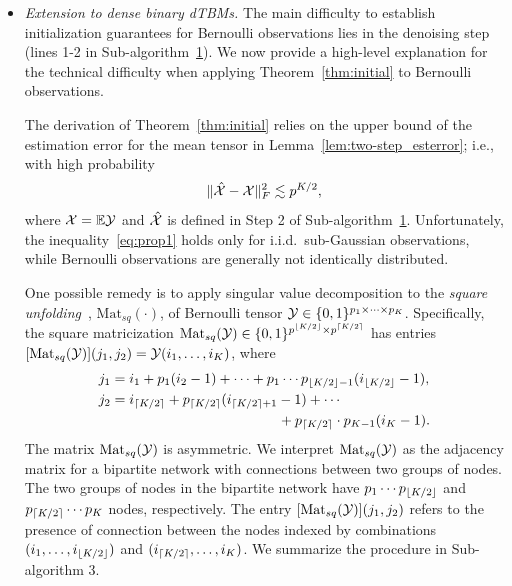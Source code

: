 \documentclass[journal]{IEEEtran}
\theoremstyle{definition}
\theoremstyle{definition}
\newcommand{\Mat}{\text{Mat}}
\DeclarePairedDelimiter{\ceil}{\lceil}{\rceil}
\DeclarePairedDelimiter{\floor}{\lfloor}{\rfloor}
\begin{document}
\begin{itemize}[wide]
    \item \textit{Extension to dense binary dTBMs.} The main difficulty to establish initialization guarantees for Bernoulli observations lies in the denoising step (lines 1-2 in Sub-algorithm~\hyperref[alg:main]{1}). We now provide a high-level explanation for the technical difficulty when applying Theorem~\ref{thm:initial} to Bernoulli observations. 
    
    
    The derivation of Theorem~\ref{thm:initial} relies on the upper bound of the estimation error for the mean tensor in Lemma~\ref{lem:two-step_esterror}; i.e., with high probability
\begin{equation}\label{eq:prop1}
    \onormSize{}{\hat \tX - \tX}_F^2 \lesssim p^{K/2},
\end{equation}
where $\mathcal{X} = \mathbb{E}\mathcal{Y}$ and $\hat {\mathcal{X}}$ is defined in Step 2 of Sub-algorithm~\hyperref[alg:main]{1}. Unfortunately, the inequality~\eqref{eq:prop1} holds only for i.i.d.\ sub-Gaussian observations, while Bernoulli observations are generally not identically distributed.  

One possible remedy is to apply singular value decomposition to the \emph{square unfolding}~\citep{mu2014square}, $\Mat_{sq}(\cdot)$, of Bernoulli tensor $\mathcal{Y} \in \{0,1\}^{p_1 \times \cdots \times p_K}$. Specifically, the square matricization $\mat_{sq} (\tY) \in \{0,1\}^{p^{\floor{K/2}} \times p^{\ceil{K/2}} }$ has entries $[\Mat_{sq}(\tY)](j_1, j_2) = \tY(i_1, \ldots, i_K)$, where
\begin{align}
    j_1 &= i_1 + p_1(i_2 - 1) + \cdots + p_1 \cdots p_{\floor{K/2}-1} (i_{\floor{K/2}} - 1),\\
    j_2 &= i_{\ceil{K/2}} + p_{ \ceil{K/2}}(i_{\ceil{K/2} + 1} - 1) + \cdots \\
    & \quad \quad \quad \quad \quad \quad \quad \quad \quad \quad \quad \quad + p_{ \ceil{K/2}} \cdot p_{K-1} (i_K-1).
\end{align}
The matrix $\Mat_{sq}(\tY)$ is asymmetric. We interpret $\Mat_{sq}(\tY)$ as the adjacency matrix for a bipartite network with connections between two groups of nodes. The two groups of nodes in the bipartite network have $p_1 \cdots p_{\floor{K/2}}$ and $ p_{\ceil{K/2}} \cdots p_K$ nodes, respectively. The entry $[\Mat_{sq}(\tY)](j_1, j_2)$ refers to the presence of connection between the nodes indexed by combinations $(i_1, \ldots, i_{\floor{K/2}})$ and $(i_{\ceil{K/2}}, \ldots, i_K)$. We summarize the procedure in Sub-algorithm 3.


\end{itemize}
\end{document}
